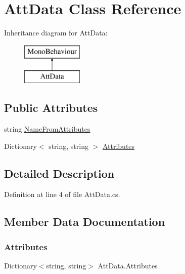 \hypertarget{class_att_data}{}\section{Att\+Data Class Reference}
\label{class_att_data}
Inheritance diagram for Att\+Data\+:\begin{figure}[H]
\begin{center}
\leavevmode
\includegraphics[height=2.000000cm]{class_att_data}
\end{center}
\end{figure}
\subsection*{Public Attributes}
\begin{DoxyCompactItemize}
\item 
string \mbox{\hyperlink{class_att_data_a502d563e2461a3f13f9ce28e54cdcea7}{Name\+From\+Attributes}}
\item 
Dictionary$<$ string, string $>$ \mbox{\hyperlink{class_att_data_ab9b4685e9c604d469cf7f3f7601a188d}{Attributes}}
\end{DoxyCompactItemize}


\subsection{Detailed Description}


Definition at line 4 of file Att\+Data.\+cs.



\subsection{Member Data Documentation}
\mbox{\label{class_att_data_ab9b4685e9c604d469cf7f3f7601a188d}} 
\subsubsection{\texorpdfstring{Attributes}{Attributes}}
{\footnotesize\ttfamily Dictionary$<$string, string$>$ Att\+Data.\+Attributes}



